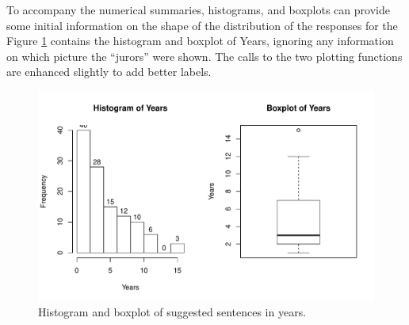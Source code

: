 \documentclass[]{book}
\newenvironment{Shaded}{\begin{snugshade}}{\end{snugshade}}
\newcommand{\KeywordTok}[1]{\textcolor[rgb]{0.13,0.29,0.53}{\textbf{#1}}}
\newcommand{\DataTypeTok}[1]{\textcolor[rgb]{0.13,0.29,0.53}{#1}}
\newcommand{\DecValTok}[1]{\textcolor[rgb]{0.00,0.00,0.81}{#1}}
\newcommand{\StringTok}[1]{\textcolor[rgb]{0.31,0.60,0.02}{#1}}
\newcommand{\OperatorTok}[1]{\textcolor[rgb]{0.81,0.36,0.00}{\textbf{#1}}}
\newcommand{\NormalTok}[1]{#1}
\theoremstyle{definition}
\theoremstyle{definition}
\theoremstyle{remark}
\begin{document}
To accompany the numerical summaries, histograms, and boxplots can
provide some initial information on the shape of the distribution of the
responses for the Figure \ref{fig:Figure2-1} contains the histogram and
boxplot of Years, ignoring any information on which picture the
``jurors'' were shown. The calls to the two plotting functions are
enhanced slightly to add better labels.



\begin{figure}
\centering
\includegraphics{02-reintroductionToStatistics_files/figure-latex/Figure2-1-1.pdf}
\caption{\label{fig:Figure2-1}Histogram and boxplot of suggested sentences in years.}
\end{figure}

\begin{Shaded}
\end{Shaded}
\end{document}
